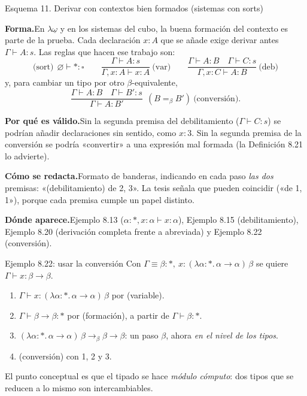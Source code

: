 \documentclass[11pt,a4paper]{article}
\newcommand{\forma}{\par\noindent\textbf{Forma.}\enspace}
\newcommand{\porque}{\par\smallskip\noindent\textbf{Por qué es válido.}\enspace}
\newcommand{\plantilla}{\par\smallskip\noindent\textbf{Cómo se redacta.}\enspace}
\newcommand{\donde}{\par\smallskip\noindent\textbf{Dónde aparece.}\enspace}
\newcommand{\bred}{\rightarrow_\beta}
\newcommand{\beq}{=_\beta}
\begin{document}
\begin{esquema}{Esquema 11. Derivar con contextos bien formados (sistemas con sorts)}
\forma En \(\lambda\underline{\omega}\) y en los sistemas del cubo, la buena
formación del contexto es parte de la prueba. Cada declaración \(x:A\) que se
añade exige derivar antes \(\Gamma\vdash A:s\). Las reglas que hacen ese
trabajo son:
\[
\text{(sort)}\ \ \varnothing\vdash *:\square\qquad
\frac{\Gamma\vdash A:s}{\Gamma,x:A\vdash x:A}\ \text{(var)}\qquad
\frac{\Gamma\vdash A:B\quad\Gamma\vdash C:s}{\Gamma,x:C\vdash A:B}\ \text{(deb)}
\]
y, para cambiar un tipo por otro \(\beta\)-equivalente,
\[
\frac{\Gamma\vdash A:B\quad\Gamma\vdash B':s}{\Gamma\vdash A:B'}\ \ (B\beq B')\ \text{(conversión)}.
\]

\porque Sin la segunda premisa del debilitamiento (\(\Gamma\vdash C:s\)) se
podrían añadir declaraciones sin sentido, como \(x:3\). Sin la segunda
premisa de la conversión se podría «convertir» a una expresión mal formada
(la Definición 8.21 lo advierte).

\plantilla Formato de banderas, indicando en cada paso \emph{las dos}
premisas: «(debilitamiento) de 2, 3». La tesis señala que pueden coincidir
(«de 1, 1»), porque cada premisa cumple un papel distinto.

\donde Ejemplo 8.13 (\(\alpha:*,x:\alpha\vdash x:\alpha\)), Ejemplo 8.15
(debilitamiento), Ejemplo 8.20 (derivación completa frente a abreviada) y
Ejemplo 8.22 (conversión).
\end{esquema}

\begin{ejemplotesis}{Ejemplo 8.22: usar la conversión}
Con \(\Gamma\equiv\beta:*,\ x:(\lambda\alpha{:}*.\,\alpha\to\alpha)\,\beta\) se
quiere \(\Gamma\vdash x:\beta\to\beta\).
\begin{enumerate}
  \item \(\Gamma\vdash x:(\lambda\alpha{:}*.\,\alpha\to\alpha)\,\beta\) por
    (variable).
  \item \(\Gamma\vdash\beta\to\beta:*\) por (formación), a partir de
    \(\Gamma\vdash\beta:*\).
  \item \((\lambda\alpha{:}*.\,\alpha\to\alpha)\,\beta\bred\beta\to\beta\): un
    paso \(\beta\), ahora \emph{en el nivel de los tipos}.
  \item (conversión) con 1, 2 y 3.
\end{enumerate}
El punto conceptual es que el tipado se hace \emph{módulo cómputo}: dos tipos
que se reducen a lo mismo son intercambiables.
\end{ejemplotesis}
\end{document}
